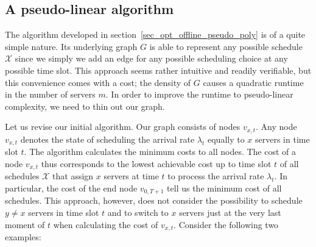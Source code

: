 \documentclass[hidelinks]{article}
\theoremstyle{plain}
\theoremstyle{definition}
\theoremstyle{rem}
\newcommand{\mx}{\mathcal{X}}
\begin{document}
\subsection{A pseudo-linear algorithm}
The algorithm developed in section~\ref{sec_opt_offline_pseudo_poly} is of a quite simple nature. Its underlying graph $G$ is able to represent any possible schedule $\mx$ since we simply we add an edge for any possible scheduling choice at any possible time slot. This approach seems rather intuitive and readily verifiable, but this convenience comes with a cost; the density of $G$ causes a quadratic runtime in the number of servers $m$. In order to improve the runtime to pseudo-linear complexity, we need to thin out our graph. 

Let us revise our initial algorithm. Our graph consists of nodes $v_{x,t}$. Any node $v_{x,t}$ denotes the state of scheduling the arrival rate $\lambda_{t}$ equally to $x$ servers in time slot $t$. The algorithm calculates the minimum costs to all nodes. The cost of a node $v_{x,t}$ thus corresponds to the lowest achievable cost up to time slot $t$ of all schedules $\mx$ that assign $x$ servers at time $t$ to process the arrival rate $\lambda_t$. In particular, the cost of the end node $v_{0,T+1}$ tell us the minimum cost of all schedules. This approach, however, does not consider the possibility to schedule $y\neq x$ servers in time slot $t$ and to switch to $x$ servers just at the very last moment of $t$ when calculating the cost of $v_{x,t}$. Consider the following two examples:
\end{document}
